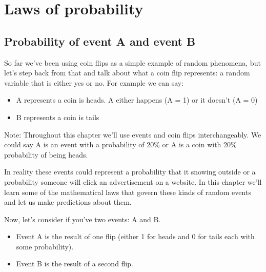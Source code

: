 \documentclass[]{article}
\providecommand{\tightlist}{%
  \setlength{\itemsep}{0pt}\setlength{\parskip}{0pt}}
\begin{document}
\hypertarget{laws-of-probability}{%
\section{Laws of probability}\label{laws-of-probability}}

\hypertarget{probability-of-event-a-and-event-b}{%
\subsection{Probability of event A and event
B}\label{probability-of-event-a-and-event-b}}

So far we've been using coin flips as a simple example of random
phenomena, but let's step back from that and talk about what a coin flip
represents: a random variable that is either yes or no. For example we
can say:

\begin{itemize}
\tightlist
\item
  A represents a coin is heads. A either happens (A = 1) or it doesn't
  (A = 0)
\item
  B represents a coin is tails
\end{itemize}

Note: Throughout this chapter we'll use events and coin flips
interchangeably. We could say A is an event with a probability of 20\%
or A is a coin with 20\% probability of being heads.

In reality these events could represent a probability that it snowing
outside or a probability someone will click an advertisement on a
website. In this chapter we'll learn some of the mathematical laws that
govern these kinds of random events and let us make predictions about
them.

Now, let's consider if you've two events: A and B.

\begin{itemize}
\tightlist
\item
  Event A is the result of one flip (either 1 for heads and 0 for tails
  each with some probability).
\item
  Event B is the result of a second flip.
\end{itemize}
\end{document}
